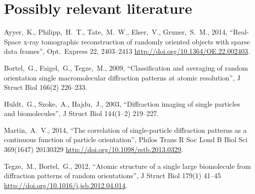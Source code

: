 \documentclass[12pt]{article}
\newcommand{\doi}[1]{{\footnotesize \url{http://doi.org/#1}}}
\begin{document}
\section*{Possibly relevant literature}\raggedright
\begin{trivlist}
\item
Ayyer,~K., Philipp,~H.~T., Tate,~M.~W., Elser,~V., Gruner,~S.~M., 2014,
``Real-Space x-ray tomographic reconstruction of randomly oriented objects with sparse data frames'',
Opt.\ Express 22, 2403--2413
\doi{10.1364/OE.22.002403}.
\item
Bortel,~G., Faigel,~G., Tegze,~M., 2009,
``Classification and averaging of random orientation single macromolecular diffraction patterns at atomic resolution'',
J Struct Biol 166(2) 226--233.
\item
Huldt,~G., Szoke,~A., Hajdu,~J., 2003,
``Diffraction imaging of single particles and biomolecules'',
J Struct Biol 144(1--2) 219--227.
\item
Martin,~A.~V., 2014,
``The correlation of single-particle diffraction patterns as a continuous function of particle orientation'',
Philos Trans R Soc Lond B Biol Sci 369(1647) 20130329
\doi{10.1098/rstb.2013.0329}.
\item
Tegze,~M., Bortel,~G., 2012,
``Atomic structure of a single large biomolecule from diffraction patterns of random orientations'',
J Struct Biol 179(1) 41--45
\doi{10.1016/j.jsb.2012.04.014}.
\end{trivlist}
\end{document}

